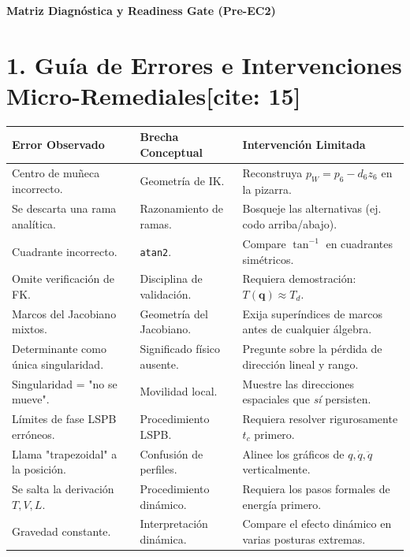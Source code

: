 \documentclass[11pt, a4paper]{article}
\begin{document}
\begin{center}
    \Large\textbf{\textcolor{ucbblue}{Matriz Diagnóstica y Readiness Gate (Pre-EC2)}}\\[0.2cm]
\end{center}

\section*{1. Guía de Errores e Intervenciones Micro-Remediales[cite: 15]}

\renewcommand{\arraystretch}{1.4}
\begin{tabularx}{\textwidth}{|>{\hsize=0.85\hsize}X|>{\hsize=0.85\hsize}X|>{\hsize=1.3\hsize}X|}
\hline
\rowcolor{gray!20} \textbf{Error Observado} & \textbf{Brecha Conceptual} & \textbf{Intervención Limitada} \\ \hline
Centro de muñeca incorrecto. & Geometría de IK. & Reconstruya $p_W = p_6 - d_6 z_6$ en la pizarra. \\ \hline
Se descarta una rama analítica. & Razonamiento de ramas. & Bosqueje las alternativas (ej. codo arriba/abajo). \\ \hline
Cuadrante incorrecto. & \texttt{atan2}. & Compare $\tan^{-1}$ en cuadrantes simétricos. \\ \hline
Omite verificación de FK. & Disciplina de validación. & Requiera demostración: $T(\mathbf{q}) \approx T_d$. \\ \hline
Marcos del Jacobiano mixtos. & Geometría del Jacobiano. & Exija superíndices de marcos antes de cualquier álgebra. \\ \hline
Determinante como única singularidad. & Significado físico ausente. & Pregunte sobre la pérdida de dirección lineal y rango. \\ \hline
Singularidad = "no se mueve". & Movilidad local. & Muestre las direcciones espaciales que \textit{sí} persisten. \\ \hline
Límites de fase LSPB erróneos. & Procedimiento LSPB. & Requiera resolver rigurosamente $t_c$ primero. \\ \hline
Llama "trapezoidal" a la posición. & Confusión de perfiles. & Alinee los gráficos de $q, \dot{q}, \ddot{q}$ verticalmente. \\ \hline
Se salta la derivación $T, V, L$. & Procedimiento dinámico. & Requiera los pasos formales de energía primero. \\ \hline
Gravedad constante. & Interpretación dinámica. & Compare el efecto dinámico en varias posturas extremas. \\ \hline
\end{tabularx}
\end{document}
